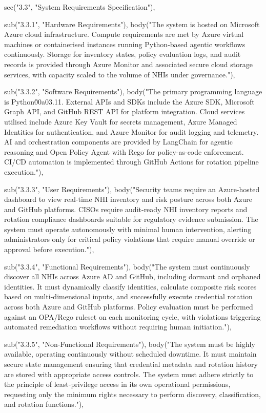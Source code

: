   sec("3.3", "System Requirements Specification"),

  sub("3.3.1", "Hardware Requirements"),
  body("The system is hosted on Microsoft Azure cloud infrastructure. Compute requirements are met by Azure virtual machines or containerised instances running Python-based agentic workflows continuously. Storage for inventory states, policy evaluation logs, and audit records is provided through Azure Monitor and associated secure cloud storage services, with capacity scaled to the volume of NHIs under governance."),

  sub("3.3.2", "Software Requirements"),
  body("The primary programming language is Python\u00a03.11. External APIs and SDKs include the Azure SDK, Microsoft Graph API, and GitHub REST API for platform integration. Cloud services utilised include Azure Key Vault for secrets management, Azure Managed Identities for authentication, and Azure Monitor for audit logging and telemetry. AI and orchestration components are provided by LangChain for agentic reasoning and Open Policy Agent with Rego for policy-as-code enforcement. CI/CD automation is implemented through GitHub Actions for rotation pipeline execution."),

  sub("3.3.3", "User Requirements"),
  body("Security teams require an Azure-hosted dashboard to view real-time NHI inventory and risk posture across both Azure and GitHub platforms. CISOs require audit-ready NHI inventory reports and rotation compliance dashboards suitable for regulatory evidence submission. The system must operate autonomously with minimal human intervention, alerting administrators only for critical policy violations that require manual override or approval before execution."),

  sub("3.3.4", "Functional Requirements"),
  body("The system must continuously discover all NHIs across Azure AD and GitHub, including dormant and orphaned identities. It must dynamically classify identities, calculate composite risk scores based on multi-dimensional inputs, and successfully execute credential rotation across both Azure and GitHub platforms. Policy evaluation must be performed against an OPA/Rego ruleset on each monitoring cycle, with violations triggering automated remediation workflows without requiring human initiation."),

  sub("3.3.5", "Non-Functional Requirements"),
  body("The system must be highly available, operating continuously without scheduled downtime. It must maintain secure state management ensuring that credential metadata and rotation history are stored with appropriate access controls. The system must adhere strictly to the principle of least-privilege access in its own operational permissions, requesting only the minimum rights necessary to perform discovery, classification, and rotation functions."),


